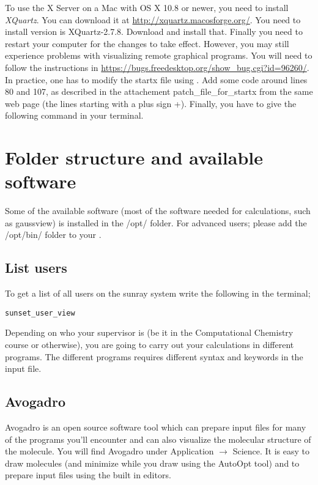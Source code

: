 \documentclass{article}
\begin{document}
To use the X Server on a Mac with OS X 10.8 or newer, you need to install \emph{XQuartz}.
You can download it at \url{http://xquartz.macosforge.org/}.
You need to install version is XQuartz-2.7.8.
Download and install that.
Finally you need to restart your computer for the changes to take effect.
However, you may still experience problems with visualizing remote graphical programs.
You will need to follow the instructions in \url{https://bugs.freedesktop.org/show_bug.cgi?id=96260/}.
In practice, one has to modify the startx file using .
Add some code around lines 80 and 107, as described in the attachement patch\_file\_for\_startx from the same web page (the lines starting with a plus sign +).
Finally, you have to give the following command  in your terminal.


\newpage
\section{Folder structure and available software}

Some of the available software (most of the software needed for calculations, such as gaussview) is installed in the /opt/ folder.
For advanced users; please add the /opt/bin/ folder to your .\\

\subsection*{List users}

To get a list of all users on the sunray system write the following in the terminal;

\begin{lstlisting}
sunset_user_view
\end{lstlisting}


Depending on who your supervisor is (be it in the Computational Chemistry course or otherwise), you are going to carry out your calculations in different programs.
The different programs requires different syntax and keywords in the input file.\\

\subsection*{Avogadro}

Avogadro is an open source software tool which can prepare input files for many of the programs you'll encounter and can also visualize the molecular structure of the molecule.
You will find Avogadro under Application $\rightarrow$ Science.
It is easy to draw molecules (and minimize while you draw using the AutoOpt tool) and to prepare input files using the built in editors.
\end{document}
